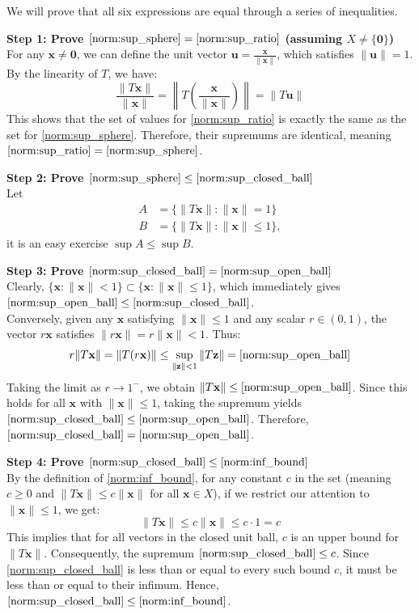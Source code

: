 \begin{pfbox}
We will prove that all six expressions are equal through a series of inequalities.

\textbf{Step 1: Prove $\eqref{norm:sup_sphere} = \eqref{norm:sup_ratio}$ (assuming $X \neq \{\mathbf{0}\}$)} \\
For any $\mathbf{x} \neq \mathbf{0}$, we can define the unit vector $\mathbf{u} = \frac{\mathbf{x}}{\|\mathbf{x}\|}$, which satisfies $\|\mathbf{u}\| = 1$. By the linearity of $T$, we have:
\[
\frac{\|T\mathbf{x}\|}{\|\mathbf{x}\|} = \left\| T\left(\frac{\mathbf{x}}{\|\mathbf{x}\|}\right) \right\| = \|T\mathbf{u}\|
\]
This shows that the set of values for \eqref{norm:sup_ratio} is exactly the same as the set for \eqref{norm:sup_sphere}. Therefore, their supremums are identical, meaning $\eqref{norm:sup_ratio} = \eqref{norm:sup_sphere}$.

\textbf{Step 2: Prove $\eqref{norm:sup_sphere} \le \eqref{norm:sup_closed_ball}$} \\
Let
\vspace{-1em}
\begin{align*}
    A &= \{ \|T\mathbf{x}\| : \|\mathbf{x}\| = 1 \} \\
    B &= \{ \|T\mathbf{x}\| : \|\mathbf{x}\| \le 1 \},
\end{align*}
it is an easy exercise $\sup A\le\sup B$.

\textbf{Step 3: Prove $\eqref{norm:sup_closed_ball} = \eqref{norm:sup_open_ball}$} \\
Clearly, $\{\mathbf{x} : \|\mathbf{x}\| < 1\} \subset \{\mathbf{x} : \|\mathbf{x}\| \le 1\}$, which immediately gives $\eqref{norm:sup_open_ball} \le \eqref{norm:sup_closed_ball}$. \\
Conversely, given any $\mathbf{x}$ satisfying $\|\mathbf{x}\| \le 1$ and any scalar $r \in (0,1)$, the vector $r\mathbf{x}$ satisfies $\|r\mathbf{x}\| = r\|\mathbf{x}\| < 1$. Thus:
\[
r\|T\mathbf{x}\| = \|T(r\mathbf{x})\| \le \sup_{\|\mathbf{z}\| < 1} \|T\mathbf{z}\| = \eqref{norm:sup_open_ball}
\]
Taking the limit as $r \to 1^-$, we obtain $\|T\mathbf{x}\| \le \eqref{norm:sup_open_ball}$. Since this holds for all $\mathbf{x}$ with $\|\mathbf{x}\| \le 1$, taking the supremum yields $\eqref{norm:sup_closed_ball} \le \eqref{norm:sup_open_ball}$. Therefore, $\eqref{norm:sup_closed_ball} = \eqref{norm:sup_open_ball}$.

\textbf{Step 4: Prove $\eqref{norm:sup_closed_ball} \le \eqref{norm:inf_bound}$} \\
By the definition of \eqref{norm:inf_bound}, for any constant $c$ in the set (meaning $c \ge 0$ and $\|T\mathbf{x}\| \le c\|\mathbf{x}\|$ for all $\mathbf{x} \in X$), if we restrict our attention to $\|\mathbf{x}\| \le 1$, we get:
\[
\|T\mathbf{x}\| \le c\|\mathbf{x}\| \le c \cdot 1 = c
\]
This implies that for all vectors in the closed unit ball, $c$ is an upper bound for $\|T\mathbf{x}\|$. Consequently, the supremum $\eqref{norm:sup_closed_ball} \le c$. Since \eqref{norm:sup_closed_ball} is less than or equal to every such bound $c$, it must be less than or equal to their infimum. Hence, $\eqref{norm:sup_closed_ball} \le \eqref{norm:inf_bound}$.


\end{pfbox}
